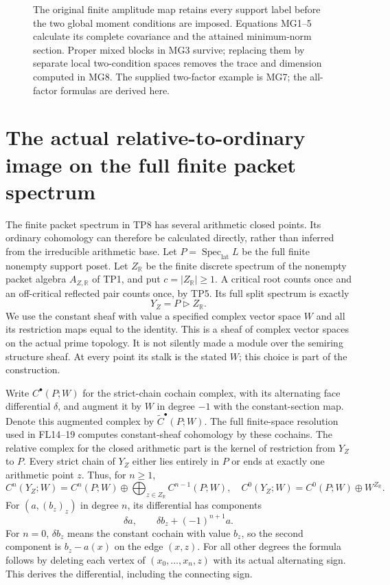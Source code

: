 \documentclass[11pt,a4paper]{article}
\theoremstyle{definition}\newtheorem{definition}[theorem]{Definition}
\newcommand{\C}{\mathbb C}\newcommand{\R}{\mathbb R}
\newcommand{\SpecLat}{\operatorname{Spec}_{\mathrm{lat}}}
\begin{document}
\begin{figure}[ht]
\centering
{}
\caption{The original finite amplitude map retains every support
label before the two global moment conditions are imposed.
Equations MG1--5 calculate its complete covariance and the attained
minimum-norm section. Proper mixed blocks in MG3 survive; replacing
them by separate local two-condition spaces removes the trace and
dimension computed in MG8. The supplied two-factor example is
MG7; the all-factor formulas are derived here.}
\end{figure}

\section{The actual relative-to-ordinary image on the full finite packet spectrum}
\label{sec:packet-interior}

The finite packet spectrum in TP8 has several arithmetic closed
points. Its ordinary cohomology can therefore be calculated directly,
rather than inferred from the irreducible arithmetic base. Let
$P=\SpecLat L$ be the full finite nonempty support poset. Let $Z_\R$
be the finite discrete spectrum of the nonempty packet algebra
$A_{Z,\R}$ of TP1, and put $c=|Z_\R|\ge1$. A critical root counts once and an
off-critical reflected pair counts once, by TP5. Its full split
spectrum is exactly
\[
 Y_Z=P\triangleright Z_\R.
 \tag{PI1}\label{pi:space}
\]
We use the constant sheaf with value a specified complex vector
space $W$ and all its restriction maps equal to the identity.
This is a sheaf of complex vector spaces on the actual prime
topology. It is not silently made a module over the semiring
structure sheaf. At every point its stalk is the stated $W$;
this choice is part of the construction.

Write $C^\bullet(P;W)$ for the strict-chain cochain complex,
with its alternating face differential $\delta$, and augment it
by $W$ in degree $-1$ with the constant-section map. Denote this
augmented complex by $\widetilde C^\bullet(P;W)$. The full
finite-space resolution used in FL14--19 computes constant-sheaf
cohomology by these cochains. The relative complex for the closed
arithmetic part is the kernel of restriction from $Y_Z$ to $P$.
Every strict chain of $Y_Z$ either lies entirely in $P$ or ends
at exactly one arithmetic point $z$. Thus, for $n\ge1$,
\[
 C^n(Y_Z;W)=C^n(P;W)\oplus
       \bigoplus_{z\in Z_\R}C^{n-1}(P;W),
 \quad
 C^0(Y_Z;W)=C^0(P;W)\oplus W^{Z_\R}.
 \tag{PI2}\label{pi:chains}
\]
For $(a,(b_z)_z)$ in degree $n$, its differential has components
\[
 \delta a,\qquad
 \delta b_z+(-1)^{n+1}a.
 \tag{PI3}\label{pi:differential}
\]
For $n=0$, $\delta b_z$ means the constant cochain with value
$b_z$, so the second component is $b_z-a(x)$ on the edge $(x,z)$.
For all other degrees the formula follows by deleting each
vertex of $(x_0,\ldots,x_n,z)$ with its actual alternating sign.
This derives the differential, including the connecting sign.
\end{document}
